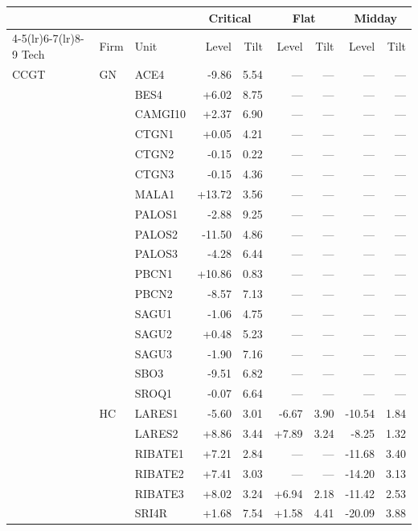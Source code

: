 \begin{tabular}{l l l r r r r r r}
\toprule
 & & & \multicolumn{2}{c}{Critical} & \multicolumn{2}{c}{Flat} & \multicolumn{2}{c}{Midday} \\
\cmidrule(lr){4-5}\cmidrule(lr){6-7}\cmidrule(lr){8-9}
Tech & Firm & Unit & Level & Tilt & Level & Tilt & Level & Tilt \\
\midrule
CCGT & GN & ACE4 & -9.86 & 5.54 & --- & --- & --- & --- \\
 &  & BES4 & +6.02 & 8.75 & --- & --- & --- & --- \\
 &  & CAMGI10 & +2.37 & 6.90 & --- & --- & --- & --- \\
 &  & CTGN1 & +0.05 & 4.21 & --- & --- & --- & --- \\
 &  & CTGN2 & -0.15 & 0.22 & --- & --- & --- & --- \\
 &  & CTGN3 & -0.15 & 4.36 & --- & --- & --- & --- \\
 &  & MALA1 & +13.72 & 3.56 & --- & --- & --- & --- \\
 &  & PALOS1 & -2.88 & 9.25 & --- & --- & --- & --- \\
 &  & PALOS2 & -11.50 & 4.86 & --- & --- & --- & --- \\
 &  & PALOS3 & -4.28 & 6.44 & --- & --- & --- & --- \\
 &  & PBCN1 & +10.86 & 0.83 & --- & --- & --- & --- \\
 &  & PBCN2 & -8.57 & 7.13 & --- & --- & --- & --- \\
 &  & SAGU1 & -1.06 & 4.75 & --- & --- & --- & --- \\
 &  & SAGU2 & +0.48 & 5.23 & --- & --- & --- & --- \\
 &  & SAGU3 & -1.90 & 7.16 & --- & --- & --- & --- \\
 &  & SBO3 & -9.51 & 6.82 & --- & --- & --- & --- \\
 &  & SROQ1 & -0.07 & 6.64 & --- & --- & --- & --- \\
 & HC & LARES1 & -5.60 & 3.01 & -6.67 & 3.90 & -10.54 & 1.84 \\
 &  & LARES2 & +8.86 & 3.44 & +7.89 & 3.24 & -8.25 & 1.32 \\
 &  & RIBATE1 & +7.21 & 2.84 & --- & --- & -11.68 & 3.40 \\
 &  & RIBATE2 & +7.41 & 3.03 & --- & --- & -14.20 & 3.13 \\
 &  & RIBATE3 & +8.02 & 3.24 & +6.94 & 2.18 & -11.42 & 2.53 \\
 &  & SRI4R & +1.68 & 7.54 & +1.58 & 4.41 & -20.09 & 3.88 \\

\end{tabular}
